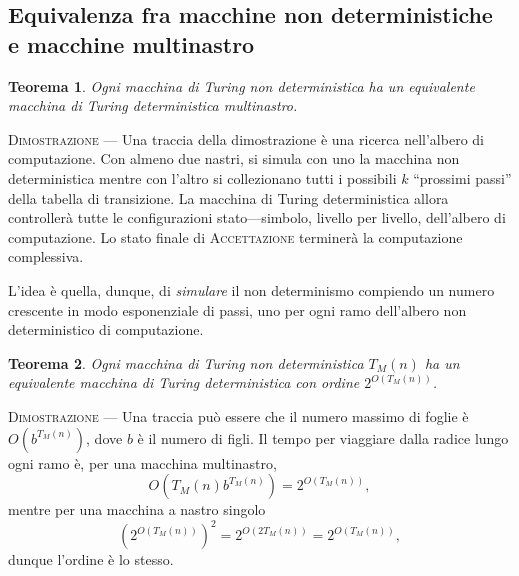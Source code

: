 \documentclass[10pt]{book}
\newtheorem{thm}{Teorema}
\begin{document}
\subsection{Equivalenza fra macchine non deterministiche e macchine multinastro}

\begin{thm}
    Ogni macchina di Turing non deterministica ha un equivalente macchina di
    Turing deterministica multinastro.
\end{thm}

\textsc{Dimostrazione} \---- Una traccia della dimostrazione è una ricerca
nell'albero di computazione. Con almeno due nastri, si simula con uno la
macchina non deterministica mentre con l'altro si collezionano tutti i
possibili $k$ ``prossimi passi'' della tabella di transizione. La macchina di
Turing deterministica allora controllerà tutte le configurazioni
stato\----simbolo, livello per livello, dell'albero di computazione. Lo stato
finale di \textsc{Accettazione} terminerà la computazione complessiva.

L'idea è quella, dunque, di \emph{simulare} il non determinismo compiendo un
numero crescente in modo esponenziale di passi, uno per ogni ramo dell'albero
non deterministico di computazione.

\begin{thm}
    Ogni macchina di Turing non deterministica $T_M(n)$ ha un equivalente
    macchina di Turing deterministica con ordine $2^{O(T_M(n))}$.
\end{thm}

\textsc{Dimostrazione} \---- Una traccia può essere che il numero massimo di
foglie è $O(b^{T_M(n)})$, dove $b$ è il numero di figli. Il tempo per viaggiare
dalla radice lungo ogni ramo è, per una macchina multinastro,
$$O(T_M(n)b^{T_M(n)}) = 2^{O(T_M(n))},$$ mentre per una macchina a nastro
singolo $$(2^{O(T_M(n))})^2 = 2^{O(2T_M(n))} = 2^{O(T_M(n))},$$ dunque l'ordine
è lo stesso.
\end{document}
